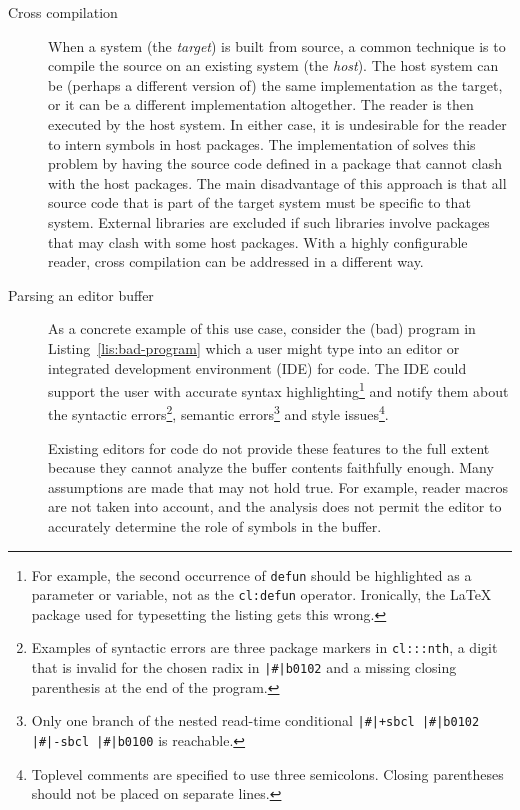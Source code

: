 \begin{description}
\item[Cross compilation] When a \cl{} system (the \emph{target}) is
  built from source, a common technique is to compile the source on an
  existing \cl{} system (the \emph{host}).  The host system can be
  (perhaps a different version of) the same implementation as the
  target, or it can be a different implementation altogether.  The
  reader is then executed by the host \cl{} system.  In either case,
  it is undesirable for the reader to intern symbols in host packages.
  The \sbcl{} implementation of \cl{} solves this problem by having
  the source code defined in a package that cannot clash with the host
  packages.  The main disadvantage of this approach is that all source
  code that is part of the target system must be specific to that
  system.  External libraries are excluded if such libraries involve
  packages that may clash with some host packages.  With a highly
  configurable reader, cross compilation can be addressed in a
  different way.
\item[Parsing an editor buffer] As a concrete example of this use
  case, consider the (bad) \cl{} program in
  Listing~\ref{lis:bad-program} which a user might type into an editor
  or integrated development environment (IDE) for \cl{} code.  The IDE
  could support the user with accurate syntax
  highlighting\footnote{For example, the second occurrence of
    \texttt{defun} should be highlighted as a parameter or variable,
    not as the \texttt{cl:defun} operator.  Ironically, the \LaTeX{}
    package used for typesetting the listing gets this wrong.} and
  notify them about the syntactic errors\footnote{Examples of
    syntactic errors are three package markers in
    \texttt{cl:::nth}, a digit that is
    invalid for the chosen radix in
    \texttt{|\#|b0102} and a missing
    closing parenthesis at the end of the program.}, semantic
  errors\footnote{Only one branch of the nested read-time conditional
    \texttt{|\#|+sbcl |\#|b0102 |\#|-sbcl
      |\#|b0100} is reachable.}  and style issues\footnote{Toplevel
    comments are specified to use three semicolons.  Closing
    parentheses should not be placed on separate lines.}.

  Existing editors for \cl{} code do not provide these features to the
  full extent because they cannot analyze the buffer contents
  faithfully enough.  Many assumptions are made that may not hold
  true.  For example, reader macros are not taken into account, and
  the analysis does not permit the editor to accurately determine the
  role of symbols in the buffer.


\end{description}
